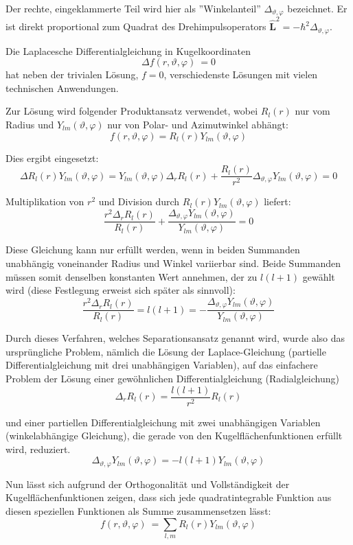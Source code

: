 \begin{definition}
\begin{description}
Der rechte, eingeklammerte Teil wird hier als ''Winkelanteil'' $\Delta_{\vartheta,\varphi}$ bezeichnet. Er ist direkt proportional zum Quadrat des Drehimpulsoperators $\hat{\mathbf{L}}^2=-\hbar^{2} \Delta_{\vartheta,\varphi}$.

Die Laplacesche Differentialgleichung in Kugelkoordinaten
\[
\Delta f(r,\vartheta,\varphi)\ = 0
\]
hat neben der trivialen Lösung, $f=0$, verschiedenste Lösungen mit vielen technischen Anwendungen.

Zur Lösung wird folgender Produktansatz verwendet, wobei $R_{l}(r)$ nur vom Radius und $Y_{lm}(\vartheta,\varphi)$ nur von Polar- und Azimutwinkel abhängt:
\[f(r,\vartheta,\varphi) = R_{l}(r) Y_{lm}(\vartheta,\varphi) \]

Dies ergibt eingesetzt:
\[\Delta R_{l}(r)Y_{lm}(\vartheta,\varphi)=Y_{lm}(\vartheta,\varphi)\Delta_{r}R_{l}(r)+\frac{R_{l}(r)}{r^{2}}\Delta_{\vartheta,\varphi}Y_{lm}(\vartheta,\varphi)=0\]

Multiplikation von $r^2$ und Division durch $R_{l}(r) Y_{lm}(\vartheta,\varphi)$ liefert:
\[\frac{r^{2}\Delta_{r}R_{l}(r)}{R_{l}(r)}+\frac{\Delta_{\vartheta,\varphi}Y_{lm}(\vartheta,\varphi)}{Y_{lm}(\vartheta,\varphi)}=0\]

Diese Gleichung kann nur erfüllt werden, wenn in beiden Summanden unabhängig voneinander Radius und Winkel variierbar sind. Beide Summanden müssen somit denselben konstanten Wert annehmen, der zu $l(l+1)$ gewählt wird (diese Festlegung erweist sich später als sinnvoll):
\[\frac{r^{2}\Delta_{r}R_{l}(r)}{R_{l}(r)}=l(l+1)=-\frac{\Delta_{\vartheta,\varphi}Y_{lm}(\vartheta,\varphi)}{Y_{lm}(\vartheta,\varphi)}\]

Durch dieses Verfahren, welches Separationsansatz genannt wird, wurde also das ursprüngliche Problem, nämlich die Lösung der Laplace-Gleichung (partielle Differentialgleichung mit drei unabhängigen Variablen), auf das einfachere Problem der Lösung einer gewöhnlichen Differentialgleichung (Radialgleichung)
\[\Delta_{r}R_{l}(r)=\frac{l(l+1)}{r^{2}}R_{l}(r)\]

und einer partiellen Differentialgleichung mit zwei unabhängigen Variablen (winkelabhängige Gleichung), die gerade von den Kugelflächenfunktionen erfüllt wird, reduziert.
\[\Delta_{\vartheta,\varphi}Y_{lm}(\vartheta,\varphi)=-l(l+1)Y_{lm}(\vartheta,\varphi)\]

Nun lässt sich aufgrund der Orthogonalität und Vollständigkeit der Kugelflächenfunktionen zeigen, dass sich jede quadratintegrable Funktion aus diesen speziellen Funktionen als Summe zusammensetzen lässt:
\[f(r,\vartheta,\varphi)\ = \sum_{l,m}R_{l}(r)Y_{lm}(\vartheta,\varphi)\]


\end{description}
\end{definition}

